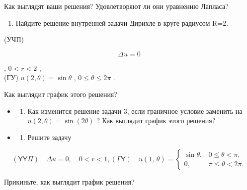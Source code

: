 \documentclass[
  ukrainian,
]{article}
\providecommand{\tightlist}{%
  \setlength{\itemsep}{0pt}\setlength{\parskip}{0pt}}
\begin{document}
Как выглядят ваши решения? Удовлетворяют ли они уравнению Лапласа?

\begin{enumerate}
\def\labelenumi{\arabic{enumi}.}
\setcounter{enumi}{2}
\tightlist
\item
  Найдите решение внутренней задачи Дирихле в круге радиусом R=2.
\end{enumerate}

(УЧП)

\[
\Delta u = 0
\]

, \(0 < r < 2\) ,\\
(ГУ) \(u(2, \theta) = \sin \theta\) , \(0 \le \theta \le 2\pi\) .

Как выглядит график этого решения?

\begin{itemize}
\tightlist
\item
  \begin{enumerate}
  \def\labelenumi{\arabic{enumi}.}
  \setcounter{enumi}{3}
  \tightlist
  \item
    Как изменится решение задачи 3, если граничное условие заменить на
    \(u(2, \theta) = \sin(2\theta)\) ? Как выглядит график этого
    решения?
  \end{enumerate}
\item
  \begin{enumerate}
  \def\labelenumi{\arabic{enumi}.}
  \setcounter{enumi}{4}
  \tightlist
  \item
    Решите задачу
  \end{enumerate}
\end{itemize}

\[
(\mathsf{Y}\mathsf{Y}\mathsf{\Pi}) \quad \Delta u = 0, \quad 0 < r < 1,
(\mathsf{\Gamma}\mathsf{Y}) \quad u(1, \, \theta) = \begin{cases} \sin \theta, & 0 \le \theta < \pi, \\ 0, & \pi \le \theta < 2\pi. \end{cases}
\]

Прикиньте, как выглядит график решения?
\end{document}
